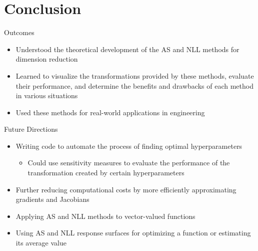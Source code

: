 \documentclass[10pt]{beamer}
\begin{document}
\section{Conclusion}
\begin{frame}{Outcomes}
\begin{itemize}\itemsep20pt
    \item Understood the theoretical development of the AS and NLL methods for dimension reduction
    
    \item Learned to visualize the transformations provided by these methods, evaluate their performance, and determine the benefits and drawbacks of each method in various situations
    
    \item Used these methods for real-world applications in engineering
\end{itemize}
\end{frame}
\begin{frame}{Future Directions}
\begin{itemize}\itemsep20pt


    
    \item Writing code to automate the process of finding optimal hyperparameters
    \begin{itemize}
        \item Could use sensitivity measures to evaluate the performance of the transformation created by certain hyperparameters
    \end{itemize}
    
    \item Further reducing computational costs by more efficiently approximating gradients and Jacobians
    
    \item Applying AS and NLL methods to vector-valued functions
    
    \item Using AS and NLL response surfaces for optimizing a function or estimating its average value
    
\end{itemize}
\end{frame}
\end{document}
